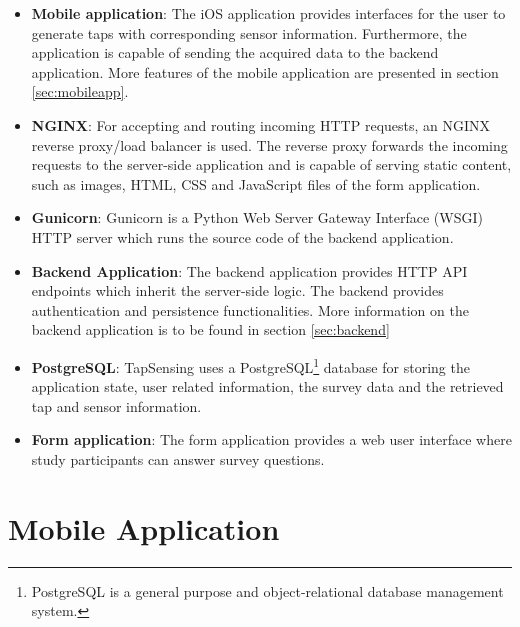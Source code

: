 \begin{itemize}
  \item \textbf{Mobile application}: The iOS application provides interfaces for the user to generate taps with corresponding sensor information. Furthermore, the application is capable of sending the acquired data to the backend application. More features of the mobile application are presented in section \ref{sec:mobileapp}. %
  \item \textbf{NGINX}: For accepting and routing incoming HTTP requests, an NGINX reverse proxy/load balancer is used. The reverse proxy forwards the incoming requests to the server-side application and is capable of serving static content, such as images, HTML, CSS and JavaScript files of the form application.
  \item \textbf{Gunicorn}: Gunicorn is a Python Web Server Gateway Interface (WSGI) HTTP server which runs the source code of the backend application.
  \item \textbf{Backend Application}: The backend application provides HTTP API endpoints which inherit the server-side logic. The backend provides authentication and persistence functionalities. More information on the backend application is to be found in section \ref{sec:backend}
  \item \textbf{PostgreSQL}: TapSensing uses a PostgreSQL\footnote{PostgreSQL is a general purpose and object-relational database management system.} database for storing the application state, user related information, the survey data and the retrieved tap and sensor information.
  \item \textbf{Form application}: The form application provides a web user interface where study participants can answer survey questions.
\end{itemize}


\section{Mobile Application}

